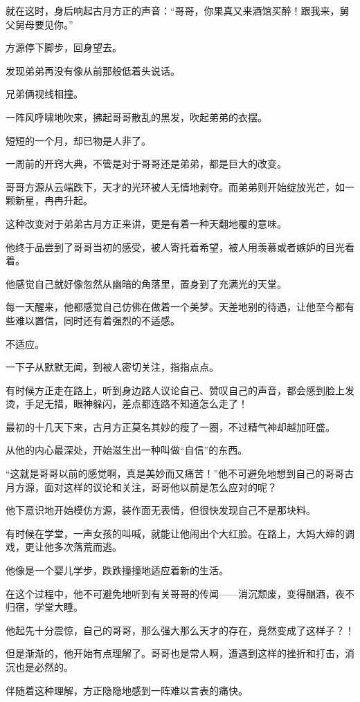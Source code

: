 \begin{this_body}
就在这时，身后响起古月方正的声音：“哥哥，你果真又来酒馆买醉！跟我来，舅父舅母要见你。”

方源停下脚步，回身望去。

发现弟弟再没有像从前那般低着头说话。

兄弟俩视线相撞。

一阵风呼啸地吹来，拂起哥哥散乱的黑发，吹起弟弟的衣摆。

短短的一个月，却已物是人非了。

一周前的开窍大典，不管是对于哥哥还是弟弟，都是巨大的改变。

哥哥方源从云端跌下，天才的光环被人无情地剥夺。而弟弟则开始绽放光芒，如一颗新星，冉冉升起。

这种改变对于弟弟古月方正来讲，更是有着一种天翻地覆的意味。

他终于品尝到了哥哥当初的感受，被人寄托着希望，被人用羡慕或者嫉妒的目光看着。

他感觉自己就好像忽然从幽暗的角落里，置身到了充满光的天堂。

每一天醒来，他都感觉自己仿佛在做着一个美梦。天差地别的待遇，让他至今都有些难以置信，同时还有着强烈的不适感。

不适应。

一下子从默默无闻，到被人密切关注，指指点点。

有时候方正走在路上，听到身边路人议论自己、赞叹自己的声音，都会感到脸上发烫，手足无措，眼神躲闪，差点都连路不知道怎么走了！

最初的十几天下来，古月方正莫名其妙的瘦了一圈，不过精气神却越加旺盛。

从他的内心最深处，开始滋生出一种叫做“自信”的东西。

“这就是哥哥以前的感觉啊，真是美妙而又痛苦！”他不可避免地想到自己的哥哥古月方源，面对这样的议论和关注，哥哥他以前是怎么应对的呢？

他下意识地开始模仿方源，装作面无表情，但很快发现自己不是那块料。

有时候在学堂，一声女孩的叫喊，就能让他闹出个大红脸。在路上，大妈大婶的调戏，更让他多次落荒而逃。

他像是一个婴儿学步，跌跌撞撞地适应着新的生活。

在这个过程中，他不可避免地听到有关哥哥的传闻——消沉颓废，变得酗酒，夜不归宿，学堂大睡。

他起先十分震惊，自己的哥哥，那么强大那么天才的存在，竟然变成了这样子？！

但是渐渐的，他开始有点理解了。哥哥也是常人啊，遭遇到这样的挫折和打击，消沉也是必然的。

伴随着这种理解，方正隐隐地感到一阵难以言表的痛快。


\end{this_body}
